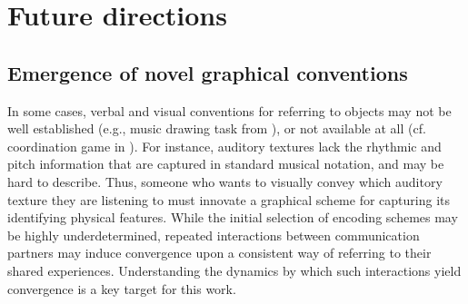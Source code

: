 \documentclass[12pt]{article}
\begin{document}
\section{Future directions}

\subsection{Emergence of novel graphical conventions}

In some cases, verbal and visual conventions for referring to objects may not be well established (e.g., music drawing task from ), or not available at all (cf. coordination game in ). For instance, auditory textures \cite{McDermott:2013ky} lack the rhythmic and pitch information that are captured in standard musical notation, and may be hard to describe. Thus, someone who wants to visually convey which auditory texture they are listening to must innovate a graphical scheme for capturing its identifying physical features. While the initial selection of encoding schemes may be highly underdetermined, repeated interactions between communication partners may induce convergence upon a consistent way of referring to their shared experiences. Understanding the dynamics by which such interactions yield convergence is a key target for this work. 



\end{document}

